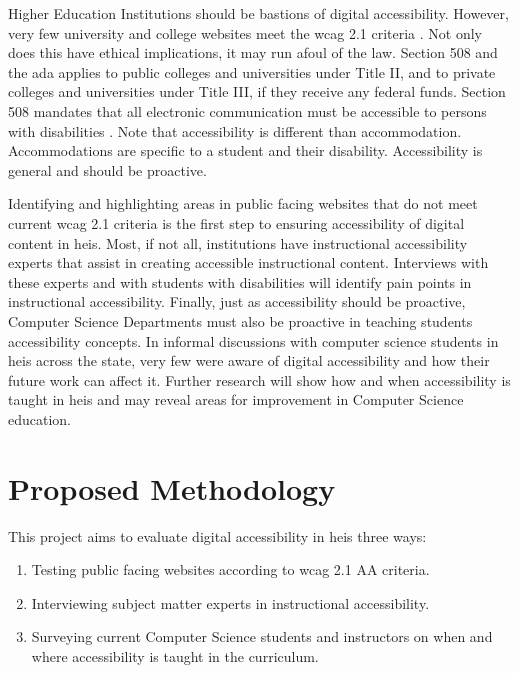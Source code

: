 \documentclass{article}
\begin{document}
Higher Education Institutions should be bastions of digital accessibility. However, very few university and college websites meet the \acrshort{wcag} 2.1 criteria \cite{empirical}. Not only does this have ethical implications, it may run afoul of the law. Section 508 and the \acrfull{ada} applies to public colleges and universities under Title II, and to private colleges and universities under Title III, if they receive any federal funds. Section 508 mandates that all electronic communication must be accessible to persons with disabilities \cite{508}. Note that accessibility is different than accommodation. Accommodations are specific to a student and their disability. Accessibility is general and should be proactive.

Identifying and highlighting areas in public facing websites that do not meet current \acrshort{wcag} 2.1 criteria is the first step to ensuring accessibility of digital content in \acrshort{heis}. Most, if not all, institutions have instructional accessibility experts that assist in creating accessible instructional content. Interviews with these experts and with students with disabilities will identify pain points in instructional accessibility. Finally, just as accessibility should be proactive, Computer Science Departments must also be proactive in teaching students accessibility concepts. In informal discussions with computer science students in \acrshort{heis} across the state, very few were aware of digital accessibility and how their future work can affect it. Further research will show how and when accessibility is taught in \acrshort{heis} and may reveal areas for improvement in Computer Science education. 

\section{Proposed Methodology}

This project aims to evaluate digital accessibility in \acrlong{heis} three ways:

\begin{enumerate}
    \item Testing public facing websites according to \acrshort{wcag} 2.1 AA criteria.
    \item Interviewing subject matter experts in instructional accessibility.
    \item Surveying current Computer Science students and instructors on when and where accessibility is taught in the curriculum.
\end{enumerate}
\end{document}
